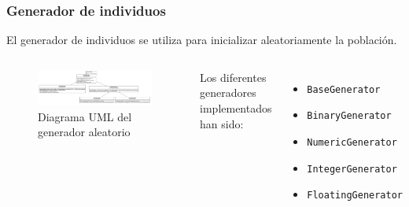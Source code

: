 \documentclass{beamer}
\begin{document}
\begin{frame}
\frametitle{Generador de individuos}

El generador de individuos se utiliza para inicializar aleatoriamente la población.

\bigskip

\begin{columns}
    \begin{figure}
        \centering
        \includegraphics[scale=0.13]{mem/images/cap-4/4.2.3(Generador)/Generator.png}
        \caption{Diagrama UML del generador aleatorio}
        \label{fig:my_label}
    \end{figure}
    Los diferentes generadores implementados han sido:
    \begin{itemize}
        \item \texttt{BaseGenerator}
        \item \texttt{BinaryGenerator}
        \item \texttt{NumericGenerator}
        \item \texttt{IntegerGenerator}
        \item \texttt{FloatingGenerator}
    \end{itemize}
    
\end{columns}

\end{frame}
\end{document}
